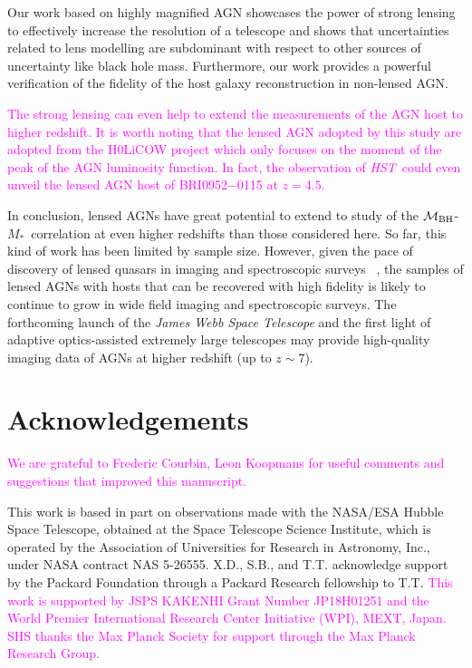 \documentclass[fleqn,usenatbib]{mnras}
\newcommand{\hst}{{\it HST}}
\newcommand{\mbh}{$\mathcal M_{\rm BH}$}
\newcommand{\mstar}{{$M_*$}}
\newcommand{\pink}[1]{{\textcolor{magenta}{#1}}}
\begin{document}
Our work based on highly magnified AGN showcases the power of strong lensing to effectively increase the resolution of a telescope and shows that uncertainties related to lens modelling are subdominant with respect to other sources of uncertainty like black hole mass. Furthermore, our work provides a powerful verification of the fidelity of the host galaxy reconstruction in non-lensed AGN. 

\pink{The strong lensing can even help to extend the measurements of the AGN host to higher redshift. It is worth noting that the lensed AGN adopted by this study are adopted from the H0LiCOW project which only focuses on the moment of the peak of the AGN luminosity function. In fact, the observation of \hst\ could even unveil the lensed AGN host of  BRI0952$-$0115 at $z=4.5$.}

In conclusion, lensed AGNs have great potential to extend to study of the \mbh-\mstar\ correlation at even higher redshifts than those considered here.  So far, this kind of work has been limited by sample size. However, given the pace of discovery of lensed quasars in imaging and spectroscopic surveys ~\citep[e.g.,][]{Oguri2010, Agn++15,Mor++16,Sch++16,Ost++17,Tre++18, Ang++18, Lem++20}, the samples of lensed AGNs with hosts that can be recovered with high fidelity is likely to continue to grow in wide field imaging and spectroscopic surveys. The forthcoming launch of the {\it James Webb Space Telescope} and the first light of adaptive optics-assisted extremely large telescopes may provide high-quality imaging data of AGNs at higher redshift (up to $z\sim7$).

\section*{Acknowledgements}
\pink{We are grateful to Frederic Courbin, Leon Koopmans for useful comments
and suggestions that improved this manuscript.}

This work is based in part on observations made with the NASA/ESA Hubble Space Telescope, obtained at the Space Telescope Science Institute, which is operated by the Association of Universities for Research in Astronomy, Inc., under NASA contract NAS 5-26555. X.D., S.B., and T.T. acknowledge support by the Packard Foundation through a Packard Research fellowship to T.T. \pink{This work is supported by JSPS KAKENHI Grant Number JP18H01251 and the World Premier International Research Center Initiative (WPI), MEXT, Japan. SHS thanks the Max Planck Society for support through the Max Planck Research Group.} 
\end{document}
